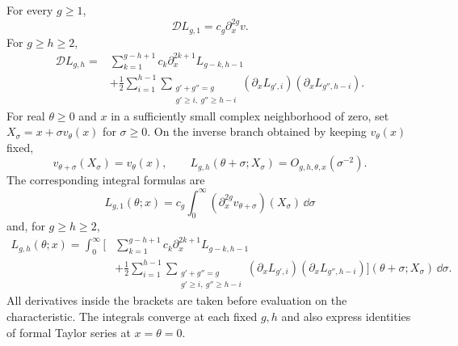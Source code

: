 \begin{prp}\label{prp:s07:transport}
For every $g\geq1$,
\begin{equation}\label{eq:s07:transport-one}
 \mathscr DL_{g,1}=c_g\partial_x^{2g}v.
\end{equation}
For $g\geq h\geq2$,
\begin{equation}\label{eq:s07:transport-higher}
 \begin{aligned}
 \mathscr DL_{g,h}
 ={}&\sum_{k=1}^{g-h+1}c_k\partial_x^{2k+1}L_{g-k,h-1}\\
 &+\frac12\sum_{i=1}^{h-1}
   \sum_{\substack{g'+g''=g\\g'\geq i,\ g''\geq h-i}}
       (\partial_xL_{g',i})(\partial_xL_{g'',h-i}).
 \end{aligned}
\end{equation}
For real $\theta\geq0$ and $x$ in a sufficiently small complex
neighborhood of zero, set
$X_\sigma=x+\sigma v_\theta(x)$ for $\sigma\geq0$.
On the inverse branch obtained by keeping $v_\theta(x)$ fixed,
\begin{equation}\label{eq:s07:characteristic}
 v_{\theta+\sigma}(X_\sigma)=v_\theta(x),\qquad
 L_{g,h}(\theta+\sigma;X_\sigma)=O_{g,h,\theta,x}(\sigma^{-2}).
\end{equation}
The corresponding integral formulas are
\begin{equation}\label{eq:s07:characteristic-one}
 L_{g,1}(\theta;x)
 =c_g\int_0^\infty
       (\partial_x^{2g}v_{\theta+\sigma})(X_\sigma)\,\dd\sigma
\end{equation}
and, for $g\geq h\geq2$,
\begin{equation}\label{eq:s07:characteristic-higher}
 \begin{aligned}
 L_{g,h}(\theta;x)=\int_0^\infty
 \Biggl[&\sum_{k=1}^{g-h+1}c_k\partial_x^{2k+1}L_{g-k,h-1}\\
 &+\frac12\sum_{i=1}^{h-1}
   \sum_{\substack{g'+g''=g\\g'\geq i,\ g''\geq h-i}}
     (\partial_xL_{g',i})(\partial_xL_{g'',h-i})
 \Biggr](\theta+\sigma;X_\sigma)\,\dd\sigma.
 \end{aligned}
\end{equation}
All derivatives inside the brackets are taken before evaluation on
the characteristic. The integrals converge at each fixed $g,h$ and
also express identities of formal Taylor series at $x=\theta=0$.
\end{prp}
